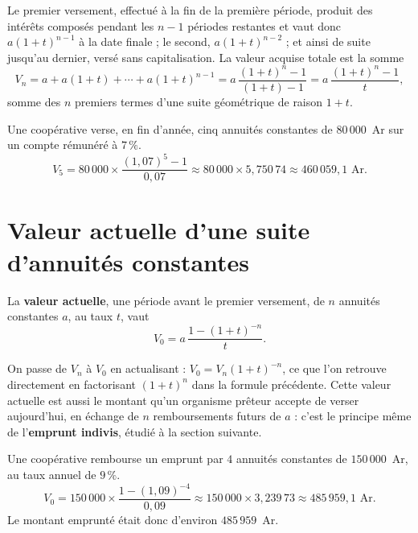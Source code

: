 \begin{demonstration}
Le premier versement, effectué à la fin de la première période, produit des
intérêts composés pendant les $n-1$ périodes restantes et vaut donc
$a(1+t)^{n-1}$ à la date finale ; le second, $a(1+t)^{n-2}$ ; et ainsi de
suite jusqu'au dernier, versé sans capitalisation. La valeur acquise totale
est la somme
\[
  V_{n} = a+a(1+t)+\cdots+a(1+t)^{n-1}
  = a\,\frac{(1+t)^{n}-1}{(1+t)-1} = a\,\frac{(1+t)^{n}-1}{t},
\]
somme des $n$ premiers termes d'une suite géométrique de raison $1+t$.
\end{demonstration}

\begin{exemple}
Une coopérative verse, en fin d'année, cinq annuités constantes de
$80\,000$~Ar sur un compte rémunéré à $7\,\%$.
\[
  V_{5} = 80\,000 \times \frac{(1{,}07)^{5}-1}{0{,}07}
  \approx 80\,000 \times 5{,}750\,74 \approx 460\,059{,}1 \text{ Ar}.
\]
\end{exemple}

\section{Valeur actuelle d'une suite d'annuités constantes}

\begin{theoreme}
La \textbf{valeur actuelle}, une période avant le premier versement, de
$n$ annuités constantes $a$, au taux $t$, vaut
\[
  V_{0} = a\,\frac{1-(1+t)^{-n}}{t} .
\]
\end{theoreme}

\begin{remarque}
On passe de $V_{n}$ à $V_{0}$ en actualisant : $V_{0} = V_{n}(1+t)^{-n}$,
ce que l'on retrouve directement en factorisant $(1+t)^{n}$ dans la formule
précédente. Cette valeur actuelle est aussi le montant qu'un organisme
prêteur accepte de verser aujourd'hui, en échange de $n$ remboursements
futurs de $a$ : c'est le principe même de l'\textbf{emprunt indivis}, étudié
à la section suivante.
\end{remarque}

\begin{exemple}
Une coopérative rembourse un emprunt par $4$ annuités constantes de
$150\,000$~Ar, au taux annuel de $9\,\%$.
\[
  V_{0} = 150\,000 \times \frac{1-(1{,}09)^{-4}}{0{,}09}
  \approx 150\,000 \times 3{,}239\,73 \approx 485\,959{,}1 \text{ Ar}.
\]
Le montant emprunté était donc d'environ $485\,959$~Ar.
\end{exemple}

